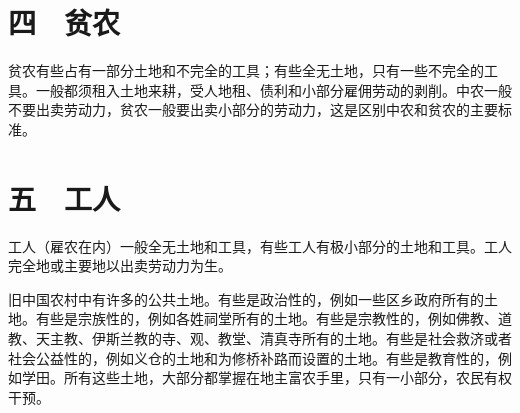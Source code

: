 \section{四　贫农}

贫农有些占有一部分土地和不完全的工具；有些全无土地，只有一些不完全的工具。一般都须租入土地来耕，受人地租、债利和小部分雇佣劳动的剥削。中农一般不要出卖劳动力，贫农一般要出卖小部分的劳动力，这是区别中农和贫农的主要标准。

\section{五　工人}

工人（雇农在内）一般全无土地和工具，有些工人有极小部分的土地和工具。工人完全地或主要地以出卖劳动力为生。


\begin{maonote}
旧中国农村中有许多的公共土地。有些是政治性的，例如一些区乡政府所有的土地。有些是宗族性的，例如各姓祠堂所有的土地。有些是宗教性的，例如佛教、道教、天主教、伊斯兰教的寺、观、教堂、清真寺所有的土地。有些是社会救济或者社会公益性的，例如义仓的土地和为修桥补路而设置的土地。有些是教育性的，例如学田。所有这些土地，大部分都掌握在地主富农手里，只有一小部分，农民有权干预。
\end{maonote}
